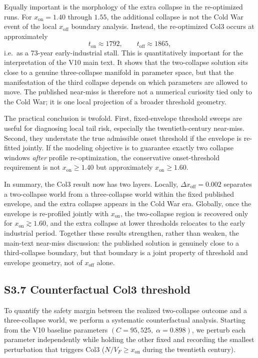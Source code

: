 \documentclass[11pt]{article}
\newcommand{\xon}{x_{\mathrm{on}}}
\newcommand{\xoff}{x_{\mathrm{off}}}
\begin{document}
Equally important is the morphology of the extra collapse in the re-optimized runs. For $\xon=1.40$ through $1.55$, the additional collapse is not the Cold War event of the local $\xoff$ boundary analysis. Instead, the re-optimized Col3 occurs at approximately
\begin{equation}
t_{\mathrm{on}} \approx 1792,\qquad t_{\mathrm{off}} \approx 1865,
\end{equation}
i.e.\ as a 73-year early-industrial stall. This is quantitatively important for the interpretation of the V10 main text. It shows that the two-collapse solution sits close to a genuine three-collapse manifold in parameter space, but that the manifestation of the third collapse depends on which parameters are allowed to move. The published near-miss is therefore not a numerical curiosity tied only to the Cold War; it is one local projection of a broader threshold geometry.

The practical conclusion is twofold. First, fixed-envelope threshold sweeps are useful for diagnosing local tail risk, especially the twentieth-century near-miss. Second, they understate the true admissible onset threshold if the envelope is re-fitted jointly. If the modeling objective is to guarantee exactly two collapse windows \emph{after} profile re-optimization, the conservative onset-threshold requirement is not $\xon\ge 1.40$ but approximately $\xon\ge 1.60$.

In summary, the Col3 result now has two layers. Locally, $\Delta x_{\mathrm{off}}=0.002$ separates a two-collapse world from a three-collapse world within the fixed published envelope, and the extra collapse appears in the Cold War era. Globally, once the envelope is re-profiled jointly with $\xon$, the two-collapse region is recovered only for $\xon\gtrsim 1.60$, and the extra collapse at lower thresholds relocates to the early industrial period. Together these results strengthen, rather than weaken, the main-text near-miss discussion: the published solution is genuinely close to a third-collapse boundary, but that boundary is a joint property of threshold and envelope geometry, not of $\xoff$ alone.

\subsection*{S3.7 Counterfactual Col3 threshold}

To quantify the safety margin between the realized two-collapse outcome and a three-collapse world, we perform a systematic counterfactual analysis.
Starting from the V10 baseline parameters $(C=95{,}525,\;\alpha=0.898)$, we perturb each parameter independently while holding the other fixed and recording the smallest perturbation that triggers Col3 ($N/V_F \ge x_{\mathrm{on}}$ during the twentieth century).
\end{document}
